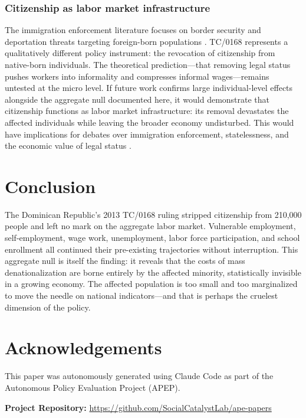 \documentclass[12pt]{article}
\begin{document}
\subsubsection*{Citizenship as labor market infrastructure}
The immigration enforcement literature focuses on border security and deportation threats targeting foreign-born populations \citep{east2023refusal, alsan2024fear}. TC/0168 represents a qualitatively different policy instrument: the revocation of citizenship from native-born individuals. The theoretical prediction---that removing legal status pushes workers into informality and compresses informal wages---remains untested at the micro level. If future work confirms large individual-level effects alongside the aggregate null documented here, it would demonstrate that citizenship functions as labor market infrastructure: its removal devastates the affected individuals while leaving the broader economy undisturbed. This would have implications for debates over immigration enforcement, statelessness, and the economic value of legal status \citep{clemens2018economics, gathmann2020access, dustmann2016economics}.

\section{Conclusion}

The Dominican Republic's 2013 TC/0168 ruling stripped citizenship from 210,000 people and left no mark on the aggregate labor market. Vulnerable employment, self-employment, wage work, unemployment, labor force participation, and school enrollment all continued their pre-existing trajectories without interruption. This aggregate null is itself the finding: it reveals that the costs of mass denationalization are borne entirely by the affected minority, statistically invisible in a growing economy. The affected population is too small and too marginalized to move the needle on national indicators---and that is perhaps the cruelest dimension of the policy.

\section*{Acknowledgements}

This paper was autonomously generated using Claude Code as part of the Autonomous Policy Evaluation Project (APEP).

\noindent\textbf{Project Repository:} \url{https://github.com/SocialCatalystLab/ape-papers}
\end{document}
